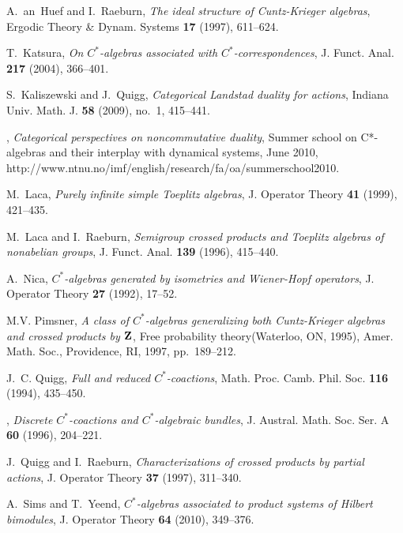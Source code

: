 \documentclass[12pt]{amsart}
\theoremstyle{plain}
\theoremstyle{remark}
\theoremstyle{definition}
\numberwithin{equation}{section}
\theoremstyle{plain}
\theoremstyle{definition}
\theoremstyle{remark}
\begin{document}
\begin{thebibliography}{EKQR06}
A.~an~Huef and I.~Raeburn, \emph{The ideal structure of {C}untz-{K}rieger
  algebras}, Ergodic Theory \& Dynam. Systems \textbf{17} (1997), 611--624.

T.~Katsura, \emph{On {$C^*$}-algebras associated with {$C^*$}-correspondences},
  J. Funct. Anal. \textbf{217} (2004), 366--401.

S.~Kaliszewski and J.~Quigg, \emph{Categorical {L}andstad duality for actions},
  Indiana Univ. Math. J. \textbf{58} (2009), no.~1, 415--441.

\bysame, \emph{Categorical perspectives on noncommutative duality}, Summer
  school on C*-algebras and their interplay with dynamical systems, June 2010,
  http://www.ntnu.no/imf/english/research/fa/oa/summerschool2010.

M.~Laca, \emph{Purely infinite simple {T}oeplitz algebras}, J. Operator Theory
  \textbf{41} (1999), 421--435.

M.~Laca and I.~Raeburn, \emph{{Semigroup crossed products and {T}oeplitz
  algebras of nonabelian groups}}, J. Funct. Anal. \textbf{139} (1996),
  415--440.

A.~Nica, \emph{{{$C^*$}-algebras generated by isometries and {W}iener-{H}opf
  operators}}, J. Operator Theory \textbf{27} (1992), 17--52.

M.V. Pimsner, \emph{A class of {$C^*$}-algebras generalizing both
  {C}untz-{K}rieger algebras and crossed products by {${\bf Z}$}}, Free
  probability theory(Waterloo, ON, 1995), Amer. Math. Soc., Providence, RI,
  1997, pp.~189--212.

J.~C. Quigg, \emph{{Full and reduced {$C^*$}-coactions}}, Math. Proc. Camb.
  Phil. Soc. \textbf{116} (1994), 435--450.

\bysame, \emph{{Discrete {$C^*$}-coactions and {$C^*$}-algebraic bundles}}, J.
  Austral. Math. Soc. Ser. A \textbf{60} (1996), 204--221.

J.~Quigg and I.~Raeburn, \emph{{Characterizations of crossed products by
  partial actions}}, J. Operator Theory \textbf{37} (1997), 311--340.

A.~Sims and T.~Yeend, \emph{{$C^*$}-algebras associated to product systems of
  {H}ilbert bimodules}, J. Operator Theory \textbf{64} (2010), 349--376.

\end{thebibliography}
\end{document}
